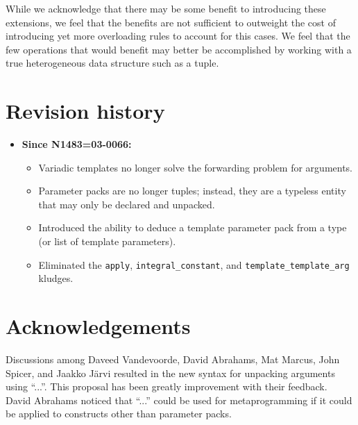 \documentclass{article}
\begin{document}
While we acknowledge that there may be some benefit to introducing
these extensions, we feel that the benefits are not sufficient to
outweight the cost of introducing yet more overloading rules to
account for this cases. We feel that the few operations that would
benefit may better be accomplished by working with a true
heterogeneous data structure such as a tuple.

\section{Revision history}
\begin{itemize}
\item \textbf{Since N1483=03-0066:} 
  \begin{itemize}
  \item Variadic templates no longer solve the forwarding problem for
    arguments. 
  \item Parameter packs are no longer tuples; instead, they are a
    typeless entity that may only be declared and unpacked.
  \item Introduced the ability to deduce a template parameter pack
    from a type (or list of template parameters).
  \item Eliminated the \texttt{apply}, \texttt{integral\_constant},
    and \texttt{template\_template\_arg} kludges.
  \end{itemize}
\end{itemize}

\section{Acknowledgements}
Discussions among Daveed Vandevoorde, David Abrahams, Mat Marcus, John
Spicer, and Jaakko J\"arvi resulted in the new syntax for
unpacking arguments using ``...''. This proposal has been greatly
improvement with their feedback. David Abrahams noticed that ``...''
could be used for metaprogramming if it could be applied to constructs
other than parameter packs. 



\end{document}

